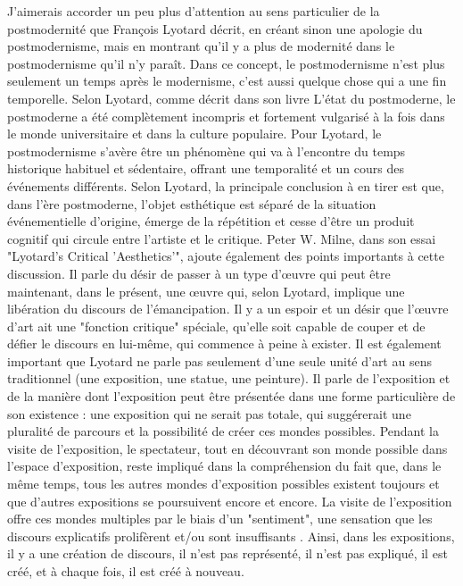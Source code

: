 \documentclass[a4paper, twoside, 12pt]{book}
\begin{document}
J'aimerais accorder un peu plus d'attention au sens particulier de la postmodernité que François Lyotard décrit, en créant sinon une apologie du postmodernisme, mais en montrant qu'il y a plus de modernité dans le postmodernisme qu'il n'y paraît. Dans ce concept, le postmodernisme n'est plus seulement un temps après le modernisme, c'est aussi quelque chose qui a une fin temporelle. Selon Lyotard, comme décrit dans son livre L'état du postmoderne, le postmoderne a été complètement incompris et fortement vulgarisé à la fois dans le monde universitaire et dans la culture populaire. Pour Lyotard, le postmodernisme s'avère être un phénomène qui va à l'encontre du temps historique habituel et sédentaire, offrant une temporalité et un cours des événements différents. Selon Lyotard, la principale conclusion à en tirer est que, dans l'ère postmoderne, l'objet esthétique est séparé de la situation événementielle d'origine, émerge de la répétition et cesse d'être un produit cognitif qui circule entre l'artiste et le critique. 
Peter W. Milne, dans son essai "Lyotard's Critical 'Aesthetics'", ajoute également des points importants à cette discussion. Il parle du désir de passer à un type d'œuvre qui peut être maintenant, dans le présent, une œuvre qui, selon Lyotard, implique une libération du discours de l'émancipation. Il y a un espoir et un désir que l'œuvre d'art ait une "fonction critique" spéciale, qu'elle soit capable de couper et de défier le discours en lui-même, qui commence à peine à exister.
Il est également important que Lyotard ne parle pas seulement d'une seule unité d'art au sens traditionnel (une exposition, une statue, une peinture). Il parle de l'exposition et de la manière dont l'exposition peut être présentée dans une forme particulière de son existence : une exposition qui ne serait pas totale, qui suggérerait une pluralité de parcours et la possibilité de créer ces mondes possibles. Pendant la visite de l'exposition, le spectateur, tout en découvrant son monde possible dans l'espace d'exposition, reste impliqué dans la compréhension du fait que, dans le même temps, tous les autres mondes d'exposition possibles existent toujours et que d'autres expositions se poursuivent encore et encore. La visite de l'exposition offre ces mondes multiples par le biais d'un "sentiment", une sensation que les discours explicatifs prolifèrent et/ou sont insuffisants . Ainsi, dans les expositions, il y a une création de discours, il n'est pas représenté, il n'est pas expliqué, il est créé, et à chaque fois, il est créé à nouveau. 
\end{document}

